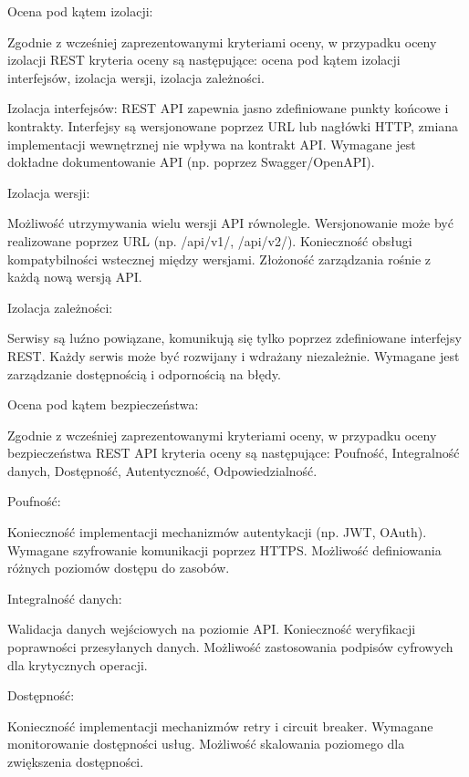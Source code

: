 \documentclass[runningheads,12pt]{llncs}
\begin{document}
Ocena pod kątem izolacji:

Zgodnie z wcześniej zaprezentowanymi kryteriami oceny, w przypadku oceny izolacji REST kryteria oceny są następujące: ocena pod kątem izolacji interfejsów, izolacja wersji, izolacja zależności.

Izolacja interfejsów: REST API zapewnia jasno zdefiniowane punkty końcowe i kontrakty. Interfejsy są wersjonowane poprzez URL lub nagłówki HTTP, zmiana implementacji wewnętrznej nie wpływa na kontrakt API. Wymagane jest dokładne dokumentowanie API (np. poprzez Swagger/OpenAPI). ~\cite[p. 124]{richardson2013rest}

Izolacja wersji: 

Możliwość utrzymywania wielu wersji API równolegle. Wersjonowanie może być realizowane poprzez URL (np. /api/v1/, /api/v2/). Konieczność obsługi kompatybilności wstecznej między wersjami. Złożoność zarządzania rośnie z każdą nową wersją API. ~\cite[p. 89]{richardson2013rest}\

Izolacja zależności: 

Serwisy są luźno powiązane, komunikują się tylko poprzez zdefiniowane interfejsy REST. Każdy serwis może być rozwijany i wdrażany niezależnie. Wymagane jest zarządzanie dostępnością i odpornością na błędy. ~\cite[p. 156]{newman2015building}

Ocena pod kątem bezpieczeństwa:

Zgodnie z wcześniej zaprezentowanymi kryteriami oceny, w przypadku oceny bezpieczeństwa REST API kryteria oceny są następujące: Poufność, Integralność danych, Dostępność, Autentyczność, Odpowiedzialność.

Poufność: 

Konieczność implementacji mechanizmów autentykacji (np. JWT, OAuth). Wymagane szyfrowanie komunikacji poprzez HTTPS. Możliwość definiowania różnych poziomów dostępu do zasobów. ~\cite[p. 245]{newman2015building}

Integralność danych: 

Walidacja danych wejściowych na poziomie API. Konieczność weryfikacji poprawności przesyłanych danych. Możliwość zastosowania podpisów cyfrowych dla krytycznych operacji. ~\cite[p. 267]{newman2015building}

Dostępność: 

Konieczność implementacji mechanizmów retry i circuit breaker. Wymagane monitorowanie dostępności usług. Możliwość skalowania poziomego dla zwiększenia dostępności. ~\cite[p. 178]{richardson2013rest}
\end{document}
